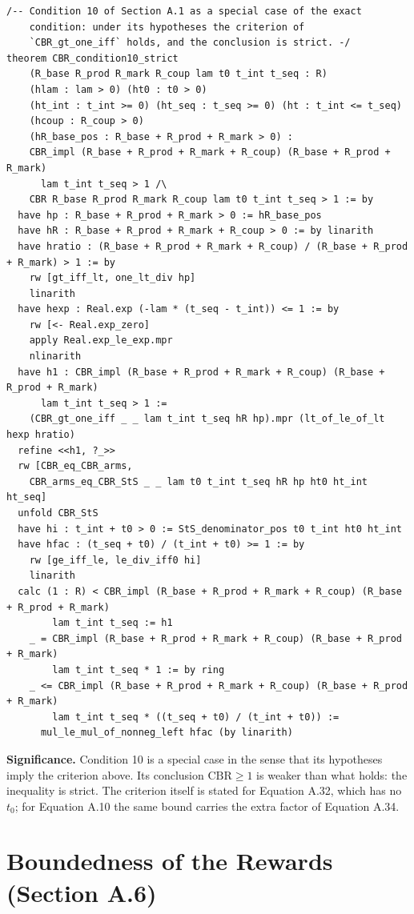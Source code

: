 \documentclass[11pt,a4paper]{article}
\begin{document}
\begin{lstlisting}
/-- Condition 10 of Section A.1 as a special case of the exact
    condition: under its hypotheses the criterion of
    `CBR_gt_one_iff` holds, and the conclusion is strict. -/
theorem CBR_condition10_strict
    (R_base R_prod R_mark R_coup lam t0 t_int t_seq : R)
    (hlam : lam > 0) (ht0 : t0 > 0)
    (ht_int : t_int >= 0) (ht_seq : t_seq >= 0) (ht : t_int <= t_seq)
    (hcoup : R_coup > 0)
    (hR_base_pos : R_base + R_prod + R_mark > 0) :
    CBR_impl (R_base + R_prod + R_mark + R_coup) (R_base + R_prod + R_mark)
      lam t_int t_seq > 1 /\
    CBR R_base R_prod R_mark R_coup lam t0 t_int t_seq > 1 := by
  have hp : R_base + R_prod + R_mark > 0 := hR_base_pos
  have hR : R_base + R_prod + R_mark + R_coup > 0 := by linarith
  have hratio : (R_base + R_prod + R_mark + R_coup) / (R_base + R_prod + R_mark) > 1 := by
    rw [gt_iff_lt, one_lt_div hp]
    linarith
  have hexp : Real.exp (-lam * (t_seq - t_int)) <= 1 := by
    rw [<- Real.exp_zero]
    apply Real.exp_le_exp.mpr
    nlinarith
  have h1 : CBR_impl (R_base + R_prod + R_mark + R_coup) (R_base + R_prod + R_mark)
      lam t_int t_seq > 1 :=
    (CBR_gt_one_iff _ _ lam t_int t_seq hR hp).mpr (lt_of_le_of_lt hexp hratio)
  refine <<h1, ?_>>
  rw [CBR_eq_CBR_arms,
    CBR_arms_eq_CBR_StS _ _ lam t0 t_int t_seq hR hp ht0 ht_int ht_seq]
  unfold CBR_StS
  have hi : t_int + t0 > 0 := StS_denominator_pos t0 t_int ht0 ht_int
  have hfac : (t_seq + t0) / (t_int + t0) >= 1 := by
    rw [ge_iff_le, le_div_iff0 hi]
    linarith
  calc (1 : R) < CBR_impl (R_base + R_prod + R_mark + R_coup) (R_base + R_prod + R_mark)
        lam t_int t_seq := h1
    _ = CBR_impl (R_base + R_prod + R_mark + R_coup) (R_base + R_prod + R_mark)
        lam t_int t_seq * 1 := by ring
    _ <= CBR_impl (R_base + R_prod + R_mark + R_coup) (R_base + R_prod + R_mark)
        lam t_int t_seq * ((t_seq + t0) / (t_int + t0)) :=
      mul_le_mul_of_nonneg_left hfac (by linarith)
\end{lstlisting}

	\noindent\textbf{Significance.} Condition 10 is a special case in the sense that its hypotheses imply the criterion above. Its conclusion $\text{CBR}\ge 1$ is weaker than what holds: the inequality is strict. The criterion itself is stated for Equation A.32, which has no $t_0$; for Equation A.10 the same bound carries the extra factor of Equation A.34.

	\section{Boundedness of the Rewards (Section A.6)}
\end{document}
